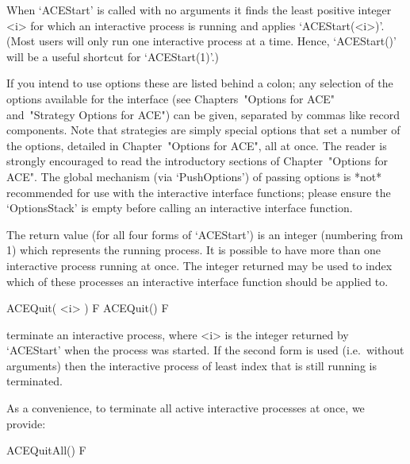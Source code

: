 When `ACEStart' is  called  with  no  arguments  it  finds  the  least
positive integer <i> for which an interactive process is  running  and
applies `ACEStart(<i>)'. (Most users will  only  run  one  interactive
process at a time. Hence, `ACEStart()' will be a useful  shortcut  for
`ACEStart(1)'.)

If you intend to use options these are  listed  behind  a  colon;  any
selection  of  the  options   available   for   the   interface   (see
Chapters~"Options for ACE" and~"Strategy  Options  for  ACE")  can  be
given,  separated  by  commas  like  record  components.   Note   that
strategies are simply  special  options  that  set  a  number  of  the
options, detailed in Chapter~"Options  for  ACE",  all  at  once.  The
reader is strongly encouraged to read  the  introductory  sections  of
Chapter~"Options for ACE". The global mechanism (via `PushOptions') of
passing options is *not* recommended  for  use  with  the  interactive
{\ACE} interface functions; please ensure the `OptionsStack' is  empty
before calling an interactive {\ACE} interface function.

The return value (for all four forms  of  `ACEStart')  is  an  integer
(numbering from  1)  which  represents  the  running  process.  It  is
possible to have more than one interactive process  running  at  once.
The integer returned may be used to index which of these processes  an
interactive {\ACE} interface function should be applied to.

\>ACEQuit( <i> ) F
\>ACEQuit() F

terminate an interactive {\ACE} process,  where  <i>  is  the  integer
returned by `ACEStart' when the process was  started.  If  the  second
form is used (i.e.~without arguments) then the interactive process  of
least index that is still running is terminated.

As a convenience, to terminate all active interactive {\ACE} processes
at once, we provide:

\>ACEQuitAll() F

\enditems


